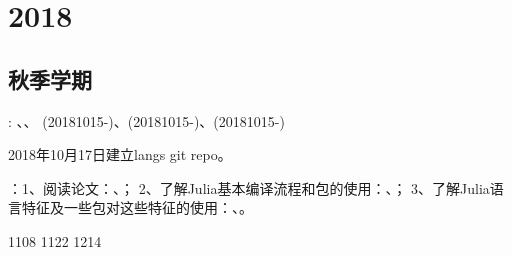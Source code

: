 \section{2018}
\label{sec:g2018}
\subsection{秋季学期}
\label{sec:g2018f}
: \ZY、\ZhangYX、
\ZhangLF (20181015-)、\CaiWT(20181015-)、\DongH(20181015-)

2018年10月17日建立langs git repo。

：1、阅读论文：\ZhangLF、\DongH；
2、了解Julia基本编译流程和包的使用：\ZhangYX、\YuCD；
3、了解Julia语言特征及一些包对这些特征的使用：\HeLY、\CaiWT。


{1108}
{1122}
{1214}



